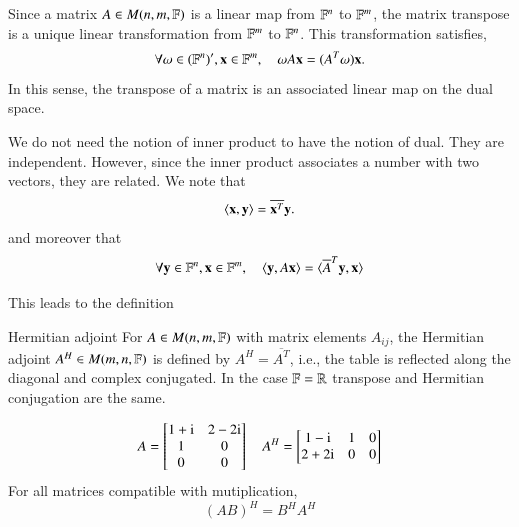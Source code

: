 Since a matrix $A \in M(n,m,\mathbb{F})$ is a linear map from $\mathbb{F}^n$ to $\mathbb{F}^m$, the matrix transpose is a unique linear transformation from $\mathbb{F}^m$ to $\mathbb{F}^n$. This transformation satisfies,
\begin{equation}
    \forall \omega \in (\mathbb{F}^n)', \mathbf{x}\in \mathbb{F}^m, \quad \omega A \mathbf{x} = (A^T\omega) \mathbf{x}.
\end{equation}
In this sense, the transpose of a matrix is an associated linear map on the dual space.

We do not need the notion of inner product to have the notion of dual. They are independent. However, since the inner product associates a number with two vectors, they are related.
We note that
        \[ \braket{\mathbf{x},\mathbf{y}} = \overline{\mathbf{x}^T} \mathbf{y}. \]
and moreover that
\begin{equation}
    \forall \mathbf{y} \in \mathbb{F}^n, \mathbf{x}\in \mathbb{F}^m, \quad \braket{\mathbf{y},A \mathbf{x}} = \braket{\overline{A}^T\mathbf{y}, \mathbf{x}}
\end{equation}

This leads to the definition
\begin{myDefinition}{Hermitian adjoint}{}
    For $A \in M(n,m,\mathbb{F})$ with matrix elements $A_{ij}$, the Hermitian adjoint $A^H \in M(m,n,\mathbb{F})$ is defined by $A^H = \overline{A^T}$, i.e., the table is reflected along the diagonal and complex conjugated. In the case $\mathbb{F}=\mathbb{R}$ transpose and Hermitian conjugation are the same.
\end{myDefinition}

\begin{myExample}{}{}
\begin{equation}
    A = \begin{bmatrix} 1 + \mathrm{i} & 2 - 2\mathrm{i} \\ 1 & 0 \\ 0 & 0 \end{bmatrix}    \quad A^H = \begin{bmatrix} 1 - \mathrm{i} & 1 & 0 \\ 2 + 2\mathrm{i} & 0 & 0\end{bmatrix} 
\end{equation}
For all matrices compatible with mutiplication, 
\begin{equation}
    (AB)^H = B^H A^H
\end{equation}
\end{myExample}

